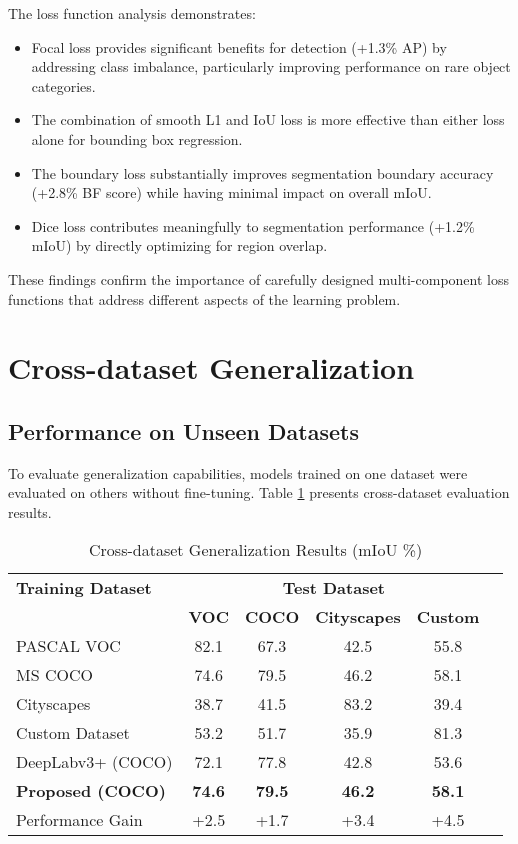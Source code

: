 The loss function analysis demonstrates:

\begin{itemize}
    \item Focal loss provides significant benefits for detection (+1.3\% AP) by addressing class imbalance, particularly improving performance on rare object categories.
    
    \item The combination of smooth L1 and IoU loss is more effective than either loss alone for bounding box regression.
    
    \item The boundary loss substantially improves segmentation boundary accuracy (+2.8\% BF score) while having minimal impact on overall mIoU.
    
    \item Dice loss contributes meaningfully to segmentation performance (+1.2\% mIoU) by directly optimizing for region overlap.
\end{itemize}

These findings confirm the importance of carefully designed multi-component loss functions that address different aspects of the learning problem.

\section{Cross-dataset Generalization}

\subsection{Performance on Unseen Datasets}
To evaluate generalization capabilities, models trained on one dataset were evaluated on others without fine-tuning. Table \ref{tab:cross_dataset} presents cross-dataset evaluation results.

\begin{table}[h]
\centering
\caption{Cross-dataset Generalization Results (mIoU \%)}
\label{tab:cross_dataset}
\begin{tabular}{lccccc}
\hline
\textbf{Training Dataset} & \multicolumn{4}{c}{\textbf{Test Dataset}} \\
 & \textbf{VOC} & \textbf{COCO} & \textbf{Cityscapes} & \textbf{Custom} \\
\hline
PASCAL VOC & 82.1 & 67.3 & 42.5 & 55.8 \\
MS COCO & 74.6 & 79.5 & 46.2 & 58.1 \\
Cityscapes & 38.7 & 41.5 & 83.2 & 39.4 \\
Custom Dataset & 53.2 & 51.7 & 35.9 & 81.3 \\
\hline
DeepLabv3+ (COCO) & 72.1 & 77.8 & 42.8 & 53.6 \\
\textbf{Proposed (COCO)} & \textbf{74.6} & \textbf{79.5} & \textbf{46.2} & \textbf{58.1} \\
Performance Gain & +2.5 & +1.7 & +3.4 & +4.5 \\
\hline
\end{tabular}
\end{table}

